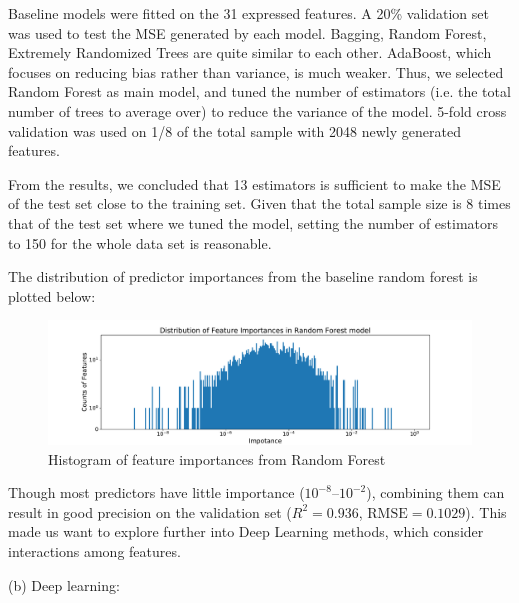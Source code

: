 \documentclass[11pt]{article}
\begin{document}
Baseline models were fitted on the 31 expressed features. A 20\% validation set was used to test the MSE generated by each model. Bagging, Random Forest, Extremely Randomized Trees are quite similar to each other. AdaBoost, which focuses on reducing bias rather than variance, is much weaker. Thus, we selected Random Forest as main model, and tuned the number of estimators (i.e. the total number of trees to average over) to reduce the variance of the model. 5-fold cross validation was used on 1/8 of the total sample with 2048 newly generated features. 

From the results, we concluded that 13 estimators is sufficient to make the MSE of the test set close to the training set. Given that the total sample size is 8 times that of the test set where we tuned the model, setting the number of estimators to 150 for the whole data set is reasonable.

The distribution of predictor importances from the baseline random forest is plotted below:

\begin{figure}[ht]
\centering
\includegraphics[width=\textwidth]{his_feature_importance}
\caption{Histogram of feature importances from Random Forest}
\label{fig:his_feature_importance}
\end{figure}

Though most predictors have little importance ($10^{-8}$--$10^{-2}$), combining them can result in good precision on the validation set ($R^2 = 0.936$, $\textrm{RMSE}=0.1029$). This made us want to explore further into Deep Learning methods, which consider interactions among features.

(b) Deep learning: 

\end{document}
